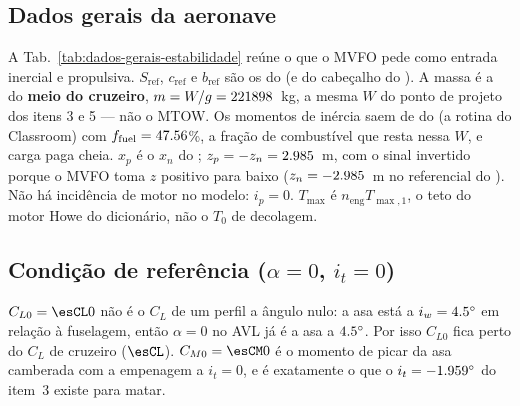 \subsection{Dados gerais da aeronave}
\label{sec:estab-dados-gerais}

A Tab.~\ref{tab:dados-gerais-estabilidade} reúne o que o MVFO pede como
entrada inercial e propulsiva. $S_{\mathrm{ref}}$, $c_{\mathrm{ref}}$ e
$b_{\mathrm{ref}}$ são os do  (e do cabeçalho do
). A massa é a do \textbf{meio do cruzeiro},
$m = W/g = 221898$~kg, a mesma $W$ do ponto de projeto dos itens 3 e 5 --- não o
MTOW. Os momentos de inércia saem de  do
 (a rotina  do Classroom) com
$f_{\mathrm{fuel}} = 47.56$\%, a fração de combustível que resta nessa $W$, e
carga paga cheia. $x_p$ é o $x_n$ do ; $z_p = -z_n =
2.985$~m, com o sinal invertido porque o MVFO toma $z$ positivo para baixo
($z_n = -2.985$~m no referencial do ). Não há incidência de
motor no modelo: $i_p = 0$. $T_{\max}$ é $n_{\mathrm{eng}}T_{\max,1}$, o teto
do motor Howe do dicionário, não o $T_0$ de decolagem.

\begin{table}[H]
\centering
\caption{Informações gerais para análise de estabilidade e controle.}
\label{tab:dados-gerais-estabilidade}

\end{table}

\subsection{Condição de referência (\texorpdfstring{$\alpha=0$}{alpha=0},
\texorpdfstring{$i_t=0$}{it=0})}
\label{sec:estab-referencia}

\begin{table}[H]
\centering
\caption{Resultados para $\alpha=0^\circ$, $i_t=0^\circ$, $\beta=0^\circ$,
$pb/2V=0$, $rb/2V=0$, $\delta_a=0^\circ$, $\delta_r=0^\circ$.}
\label{tab:cl0-cm0}

\end{table}

$C_{L0} = \esCL0$ não é o $C_L$ de um perfil a ângulo nulo: a asa está a
$i_w = 4.5^\circ$ em relação à fuselagem, então $\alpha = 0$ no AVL já é a
asa a $4.5^\circ$. Por isso $C_{L0}$ fica perto do $C_L$ de cruzeiro
($\esCL$). $C_{M0} = \esCM0$ é o momento de picar da asa camberada com a
empenagem a $i_t = 0$, e é exatamente o que o $i_t = -1.959^\circ$ do item~3
existe para matar.

